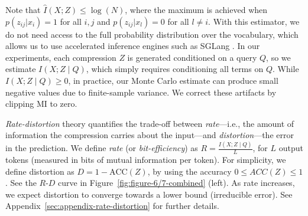 \documentclass{article} %
\begin{document}
Note that $\hat{I}(X;Z) \leq \log(N)$, where the maximum is achieved when $p(z_{ij} | x_i) = 1$ for all $i,j$ and $p(z_{ij} | x_l) = 0$ for all $l \neq i$. With this estimator, we do not need access to the full probability distribution over the vocabulary, which allows us to use accelerated inference engines such as SGLang \citep{zheng2024sglang}. In our experiments, each compression $Z$ is generated conditioned on a query $Q$, so we estimate \(I(X;Z \mid Q)\), which simply requires conditioning all terms on $Q$. While \(I(X;Z \mid Q) \geq 0\), in practice, our Monte Carlo estimate can produce small negative values due to finite-sample variance. We correct these artifacts by clipping MI to zero. 





\emph{Rate-distortion} theory quantifies the trade-off between \emph{rate}---i.e., the amount of information the compression carries about the input---and \emph{distortion}---the error in the prediction.
We define \emph{rate} (or \emph{bit-efficiency}) as $R = \frac{I(X;Z \mid Q)}{L}$, for $L$ output tokens (measured in bits of mutual information per token). For simplicity, we define distortion as $D = 1 - \text{ACC}(Z)$, by using the accuracy $0\leq ACC(Z) \leq 1$. See the $R$-$D$ curve in Figure~\ref{fig:figure-6/7-combined} (left). As rate increases, we expect distortion to converge towards a lower bound (irreducible error).
See Appendix~\ref{sec:appendix-rate-distortion} for further details.
\end{document}
